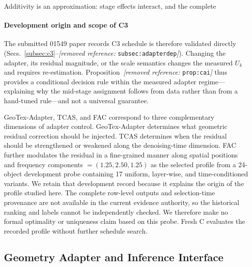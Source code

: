 \documentclass[times,twocolumn,final]{elsarticle}
\providecommand{\DIFadd}[1]{{\protect\color{blue} \sf #1}} %
\providecommand{\DIFdel}[1]{{\protect\color{red} \scriptsize #1}} %
\providecommand{\DIFaddbegin}{} %
\providecommand{\DIFaddend}{} %
\providecommand{\DIFdelbegin}{} %
\providecommand{\DIFdelend}{} %
\begin{document}
\DIFdelbegin %
\DIFdel{Additivity is an approximation: stage effects interact, and the complete }\DIFdelend \DIFaddbegin \paragraph{Development origin and scope of C3}
\DIFadd{The submitted 01549 paper records }\DIFaddend C3 \DIFdelbegin \DIFdel{schedule is therefore validated directly (Secs.~\ref{subsec:c3}--\textit{[removed reference: }\texttt{subsec:adapterdep}\textit{]}). Changing the adapter, its residual magnitude, or the scale semantics changes the measured $U_k$ and requires re-estimation. Proposition~\textit{[removed reference: }\texttt{prop:cai}\textit{]} thus provides a conditional decision rule within the measured adapter regime---explaining why the mid-stage assignment follows from data rather than from a hand-tuned rule---and not a universal guarantee.
}%


\DIFdel{GeoTex-Adapter, TCAS, and FAC correspond to three complementary dimensions of adapter control. GeoTex-Adapter determines what geometric residual correction should be injected. TCAS determines when the residual should be strengthened or weakened along the denoising-time dimension. FAC further modulates the residual in a fine-grained manner along spatial positions and frequency components}\DIFdelend \DIFaddbegin \DIFadd{$=(1.25,2.50,1.25)$ as the selected profile from a 24-object development probe containing 17 uniform, layer-wise, and time-conditioned variants. We retain that development record because it explains the origin of the profile studied here. The complete row-level outputs and selection-time provenance are not available in the current evidence authority, so the historical ranking and labels cannot be independently checked. We therefore make no formal optimality or uniqueness claim based on this probe. Fresh C evaluates the recorded profile without further schedule search}\DIFaddend .

\DIFaddbegin \subsection{Geometry Adapter and Inference Interface}
\label{subsec:adapterimpl}
\end{document}
